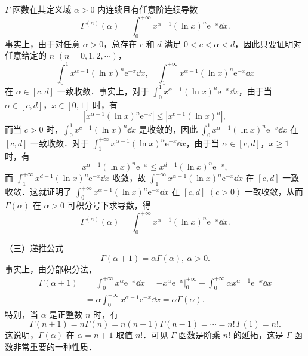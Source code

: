 $\Gamma$ 函数在其定义域 $\alpha>0$ 内连续且有任意阶连续导数
\[
\Gamma^{(n)}(\alpha)=\int_{0}^{+\infty}x^{\alpha-1}\left(\ln x\right)^{n}\mathrm{e}^{-x}\dd x.
\]
事实上，由于对任意 $\alpha>0$，总存在 $c$ 和 $d$ 满足 $0<c<\alpha<d$，因此只要证明对任意给定的 $n$ $(n=0,1,2,\cdots)$，
\[
\int_{0}^{1}x^{\alpha-1}\left(\ln x\right)^{n}\mathrm{e}^{-x}\dd x,\quad\int_{1}^{+\infty}x^{\alpha-1}\left(\ln x\right)^{n}\mathrm{e}^{-x}\dd x
\]
在 $\alpha\in[c,d]$ 一致收敛．事实上，对于 $\displaystyle\int_{0}^{1}x^{\alpha-1}(\ln x)^{n}\mathrm{e}^{-x}\dd x$，由于当 $\alpha\in[c,d]$，$x\in[0,1]$ 时，有
\[
\left|x^{\alpha-1}(\ln x)^{n}\mathrm{e}^{-x}\right|\leqslant\left|x^{c-1}(\ln x)^{n}\right|,
\]
而当 $c>0$ 时，$\displaystyle\int_{0}^{1}x^{c-1}(\ln x)^{n}\dd x$ 是收敛的，因此 $\displaystyle\int_{0}^{1}x^{\alpha-1}(\ln x)^{n}\mathrm{e}^{-x}\dd x$ 在 $[c,d]$ 一致收敛．对于 $\displaystyle\int_{1}^{+\infty}x^{\alpha-1}(\ln x)^{n}\mathrm{e}^{-x}\dd x$，由于当 $\alpha\in[c,d]$，$x\geqslant 1$ 时，有
\[
x^{\alpha-1}(\ln x)^{n}\mathrm{e}^{-x}\leqslant x^{d-1}(\ln x)^{n}\mathrm{e}^{-x},
\]
而 $\displaystyle\int_{1}^{+\infty}x^{d-1}(\ln x)^{n}\mathrm{e}^{-x}\dd x$ 收敛，故 $\displaystyle\int_{1}^{+\infty}x^{\alpha-1}(\ln x)^{n}\mathrm{e}^{-x}\dd x$ 在 $[c,d]$ 一致收敛．这就证明了 $\displaystyle\int_{0}^{+\infty}x^{\alpha-1}(\ln x)^{n}\mathrm{e}^{-x}\dd x$ 在 $[c,d]$ $(c>0)$ 一致收敛，从而 $\Gamma(\alpha)$ 在 $\alpha>0$ 可积分号下求导数，得
\[
\Gamma^{(n)}(\alpha)=\int_{0}^{+\infty}x^{\alpha-1}(\ln x)^{n}\mathrm{e}^{-x}\dd x.
\]

（三）递推公式
\[
\Gamma(\alpha+1)=\alpha\Gamma(\alpha),\ \alpha>0.
\]
事实上，由分部积分法，
\[
\begin{aligned}
\Gamma(\alpha+1)&=\int_{0}^{+\infty}x^{\alpha}\mathrm{e}^{-x}\dd x=\left.-x^{\alpha}\mathrm{e}^{-x}\right|_{0}^{+\infty}+\int_{0}^{+\infty}\alpha x^{\alpha-1}\mathrm{e}^{-x}\dd x\\
&=\alpha\int_{0}^{+\infty}x^{\alpha-1}\mathrm{e}^{-x}\dd x=\alpha\Gamma(\alpha).
\end{aligned}
\]
特别，当 $\alpha$ 是正整数 $n$ 时，有
\[
\Gamma(n+1)=n\Gamma(n)=n(n-1)\Gamma(n-1)=\cdots=n!\,\Gamma(1)=n!.
\]
这说明，$\Gamma(\alpha)$ 在 $\alpha=n+1$ 取值 $n!$．可见 $\Gamma$ 函数是阶乘 $n!$ 的延拓，这是 $\Gamma$ 函数非常重要的一种性质．

